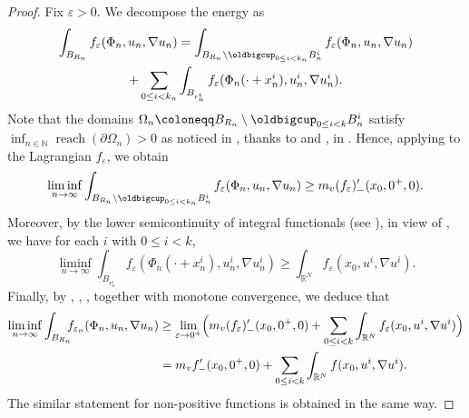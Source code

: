 \documentclass[JEP,XML,SOM,Unicode,published]{cedram}
\theoremstyle{plain}
\theoremstyle{definition}
\newcommand{\N}{\mathbb{N}}
\newcommand{\R}{\mathbb{R}}
\newcommand{\eps}{\varepsilon}
\DeclareMathOperator{\reach}{reach}
\begin{document}
\begin{proof}
Fix \(\eps>0\). We decompose the energy as
\begin{multline}\label{lowerBoundExistence}
\int_{B_{R_n}}f_{\eps}(\Phi_n,u_n,\nabla u_n)
=
\int_{B_{R_n}\setminus \oldbigcup_{0\leq i<k_n}B^i_n}f_{\eps}(\Phi_n,u_n,\nabla u_n)\\
+
\sum_{0\leq i<k_n}\int_{B_{r^i_n}}f_{\eps}(\Phi_n(\cdot+x^i_n),u^i_n,\nabla u^i_n).
\end{multline}
Note that the domains \(\Omega_n\coloneqq B_{R_n}\setminus \oldbigcup_{0\leq i<k}B^i_n\) satisfy \(\inf_{n\in\N}\reach(\partial\Omega_n)>0\) as noticed in , thanks to  and ,  in . Hence, applying  to the Lagrangian \(f_\eps\), we obtain
\begin{equation}
\label{vanishingLowerBoundExistence}
\liminf_{n\to\infty}\int_{B_{R_n}\setminus \oldbigcup_{0\leq i<k_n}B^i_n}f_{\eps}(\Phi_n,u_n,\nabla u_n)
\geq m_v(f_\eps)'_-(x_0,0^+,0).
\end{equation}
Moreover, by the lower semicontinuity of integral functionals (see \cite[Th.\,4.1.1]{buttazzoSemicontinuityRelaxationIntegral1989}), in view of , we have for each \(i\) with \(0\leq i<k\),
\begin{equation}\label{lowerBoundButtazzo}
\liminf_{n\to\infty}
\int_{B_{r^i_n}}f_{\eps}(\Phi_n(\cdot+x^i_n),u^i_n,\nabla u^i_n)
\geq
\int_{\R^N}f_\eps(x_0,u^i,\nabla u^i).
\end{equation}
Finally, by , , ,  together with monotone convergence, we deduce that
\begin{align*}
\liminf_{n\to\infty}\int_{B_{R_n}}\hspace*{-2mm}f_{\eps_n}(\Phi_n,u_n,\nabla u_n)
&\geq
\lim_{\eps\to 0^+}\Bigl(
m_v (f_\eps)'_-(x_0,0^+,0)
+
\sum_{0\leq i<k}
\int_{\R^N}f_\eps(x_0,u^i,\nabla u^i)\Bigr)
\\
&=m_vf'_{-}(x_0,0^+,0)
+
\sum_{0\leq i<k}
\int_{\R^N}f(x_0,u^i,\nabla u^i).
\end{align*}
The similar statement for non-positive functions is obtained in the same way.
\end{proof}
\end{document}
